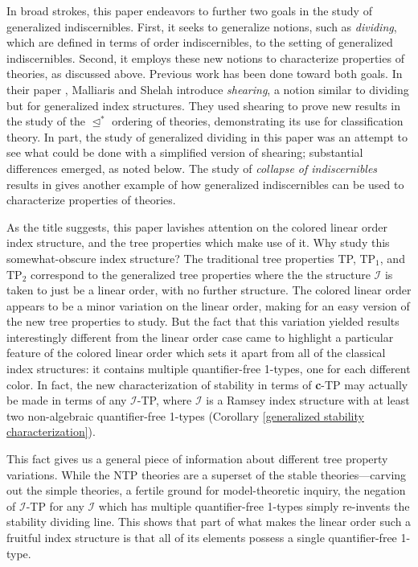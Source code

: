 \documentclass{article}
\newcommand{\calI}{\mathcal{I}}
\newcommand{\TPi}{\text{TP}_1}
\newcommand{\TPii}{\text{TP}_2}
\theoremstyle{definition}
\theoremstyle{definition}
\theoremstyle{definition}
\theoremstyle{definition}
\begin{document}
In broad strokes, this paper endeavors to further two goals in the study of generalized indiscernibles. First, it seeks to generalize notions, such as \textit{dividing}, which are defined in terms of order indiscernibles, to the setting of generalized indiscernibles. Second, it employs these new notions to characterize properties of theories, as discussed above. Previous work has been done toward both goals. In their paper \cite{malliaris_shelah_2021_separation_theorem}, Malliaris and Shelah introduce \textit{shearing}, a notion similar to dividing but for generalized index structures. They used shearing to prove new results in the study of the $\trianglelefteq^*$ ordering of theories, demonstrating its use for classification theory. In part, the study of generalized dividing in this paper was an attempt to see what could be done with a simplified version of shearing; substantial differences emerged, as noted below. The study of \textit{collapse of indiscernibles} results in \cite{guingona2017characterizing} gives another example of how generalized indiscernibles can be used to characterize properties of theories.

As the title suggests, this paper lavishes attention on the colored linear order index structure, and the tree properties which make use of it. Why study this somewhat-obscure index structure? The traditional tree properties TP, $\TPi$, and $\TPii$ correspond to the generalized tree properties where the the structure $\calI$ is taken to just be a linear order, with no further structure. The colored linear order appears to be a minor variation on the linear order, making for an easy version of the new tree properties to study. But the fact that this variation yielded results interestingly different from the linear order case came to highlight a particular feature of the colored linear order which sets it apart from all of the classical index structures: it contains multiple quantifier-free 1-types, one for each different color. In fact, the new characterization of stability in terms of \textbf{c}-TP may actually be made in terms of any $\calI$-TP, where $\calI$ is a Ramsey index structure with at least two non-algebraic quantifier-free 1-types (Corollary \ref{generalized stability characterization}). 

This fact gives us a general piece of information about different tree property variations. While the NTP theories are a superset of the stable theories---carving out the simple theories, a fertile ground for model-theoretic inquiry, the negation of $\calI$-TP for any $\calI$ which has multiple quantifier-free 1-types simply re-invents the stability dividing line. This shows that part of what makes the linear order such a fruitful index structure is that all of its elements possess a single quantifier-free 1-type.
\end{document}
